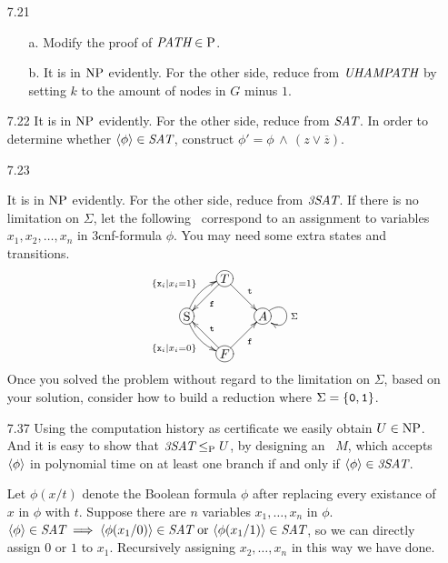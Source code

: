 \begin{itemize}
	\item[7.21]
	\begin{itemize}
		\item[a.] Modify the proof of $\textit{PATH} \in \Poly$.
		\item[b.] It is in $\NPoly$ evidently. For the other side, reduce from $\IT{UHAMPATH}$ by setting $k$ to the amount of nodes in $G$ minus $1$.
	\end{itemize}

	\item[7.22]
	It is in $\NPoly$ evidently. For the other side, reduce from $\IT{SAT}$. In order to determine whether $\Bra{\phi} \in \IT{SAT}$, construct $\phi' = \phi \,\wedge\,(z \vee \overline{z})$.
	
	\item[7.23]
	\Omit
	
	\item[\Star 7.36] 
	It is in $\NPoly$ evidently. For the other side, reduce from $\IT{3SAT}$. If there is no limitation on $\Sigma$, let the following \DFA\ correspond to an assignment to variables $x_1, x_2, \dots, x_n$ in 3cnf-formula $\phi$. You may need some extra states and transitions.
	$$
		\xymatrix@ur@R=2pc@C=2pc{
			*+[o][F-]{\RM{S}} \ar@/^/[r]^{\{ \TT{x}_i | x_i = 1 \}} \ar@/_/[d]_{\{ \TT{x}_i | x_i = 0 \}} &
			*+[o][F-]{T} \ar^{\TT{t}}[d] \ar^{\TT{f}}[l] \\
			*+[o][F-]{F} \ar_{\TT{f}}[r] \ar_{\TT{t}}[u] & 
			*+[o][F-]{A} \ar@(ur,rd)[]^{\Sigma}
		}
	$$
	Once you solved the problem without regard to the limitation on $\Sigma$, based on your solution, consider how to build a reduction where $\Sigma = \{ \TT{0}, \TT{1} \}$.
	
	\item[7.37]
	Using the computation history as certificate we easily obtain $U \in \NPoly$. And it is easy to show that $\IT{3SAT} \LeqP U$, by designing an \NTM\ $M$, which accepts $\Bra{\phi}$ in polynomial time on at least one branch if and only if $\Bra{\phi} \in \IT{3SAT}$.
	
	\item[\Star 7.38]
	Let $\phi(x/t)$ denote the Boolean formula $\phi$ after replacing every existance of $x$ in $\phi$ with $t$. Suppose there are $n$ variables $x_1, \dots, x_n$ in $\phi$. $\Bra{\phi} \in \IT{SAT} \implies \Bra{\phi(x_1/0)} \in \IT{SAT} \text{ or } \Bra{\phi(x_1/1)} \in \IT{SAT}$, so we can directly assign $0$ or $1$ to $x_1$. Recursively assigning $x_2, \dots, x_n$ in this way we have done.
	

\end{itemize}
